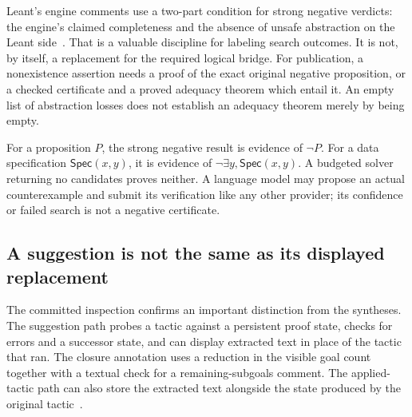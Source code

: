 \documentclass[11pt,a4paper]{article}
\newcommand{\code}[1]{\texttt{\detokenize{#1}}}
\newcommand{\Spec}{\mathsf{Spec}}
\theoremstyle{remark}
\begin{document}
Leant's engine comments use a two-part condition for strong negative verdicts:
the engine's claimed completeness and the absence of unsafe abstraction on the
Leant side~\cite{lengine}. That is a valuable discipline for labeling search
outcomes. It is not, by itself, a replacement for the required logical bridge.
For publication, a nonexistence assertion needs a proof of the exact original
negative proposition, or a checked certificate and a proved adequacy theorem
which entail it. An empty list of abstraction losses does not establish an
adequacy theorem merely by being empty.

For a proposition $P$, the strong negative result is evidence of $\neg P$.
For a data specification $\Spec(x,y)$, it is evidence of
$\neg\exists y,\Spec(x,y)$. A budgeted solver returning no candidates proves
neither. A language model may propose an actual counterexample and submit its
verification like any other provider; its confidence or failed search is not
a negative certificate.

\subsection{A suggestion is not the same as its displayed replacement}
The committed \code{Main.hs} inspection confirms an important distinction from
the syntheses. The suggestion path probes a tactic against a persistent proof
state, checks for errors and a successor state, and can display extracted
\code{Try this} text in place of the tactic that ran. The closure annotation uses
a reduction in the visible goal count together with a textual check for a
remaining-subgoals comment. The applied-tactic path can also store the extracted
text alongside the state produced by the original tactic~\cite{lmain}.
\end{document}

